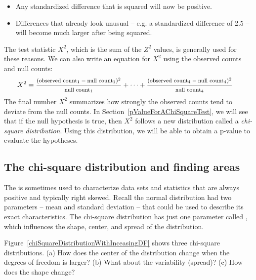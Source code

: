 \begin{itemize}
\setlength{\itemsep}{0mm}
\item Any standardized difference that is squared will now be positive.
\item Differences that already look unusual -- e.g. a standardized difference of 2.5 -- will become much larger after being squared.
\end{itemize}
The test statistic $X^2$, which is the sum of the $Z^2$ values, is generally used for these reasons. We can also write an equation for $X^2$ using the observed counts and null counts:
\begin{align*}
X^2 &=
	\frac
	{\text{\footnotesize$(\text{observed count}_1 - \text{null count}_1)^2$}}
	{\text{\footnotesize$\text{null count}_1$}}
	+ \dots + \frac
	{\text{\footnotesize$(\text{observed count}_4 - \text{null count}_4)^2$}}
	{\text{\footnotesize$\text{null count}_4$}}
\end{align*}
The final number $X^2$ summarizes how strongly the observed counts tend to deviate from the null counts. In Section~\ref{pValueForAChiSquareTest}, we will see that if the null hypothesis is true, then $X^2$ follows a new distribution called a \emph{chi-square distribution}. Using this distribution, we will be able to obtain a p-value to evaluate the hypotheses.


\subsection{The chi-square distribution and finding areas}

The  is sometimes used to characterize data sets and statistics that are always positive and typically right skewed. Recall the normal distribution had two parameters -- mean and standard deviation -- that could be used to describe its exact characteristics. The chi-square distribution has just one parameter called , which influences the shape, center, and spread of the distribution.

\begin{exercisewrap}
\begin{nexercise}\label{exerChiSquareDistributionDescriptionWithMoreDOF}
Figure~\ref{chiSquareDistributionWithInceasingDF} shows three chi-square distributions. (a) How does the center of the distribution change when the degrees of freedom is larger? (b) What about the variability (spread)? (c) How does the shape change?\footnotemark
\end{nexercise}
\end{exercisewrap}

